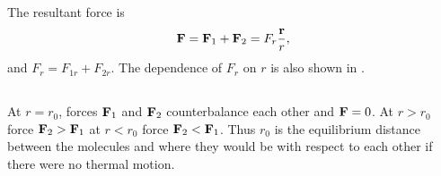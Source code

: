 The resultant force is 
\begin{equation*}%
\vb{F} = \vb{F}_{1} + \vb{F}_{2} = F_{r} \frac{\vb{r}}{r}, 
\end{equation*}
and $F_{r} = F_{1r} + F_{2r}$. The dependence of $F_{r}$ on $r$ is also shown in .

\subsection{}\label{12.1.5} At $r = r_{0}$, forces $\vb{F}_{1}$ and $\vb{F}_{2}$ counterbalance each other and $\vb{F} = 0$. At $r > r_{0}$ force $\vb{F}_{2} > \vb{F}_{1}$ at $r < r_{0}$ force $\vb{F}_{2} < \vb{F}_{1}$. Thus $r_{0}$ is the equilibrium distance between the molecules and where they would be with respect to each other if there were no thermal motion.

